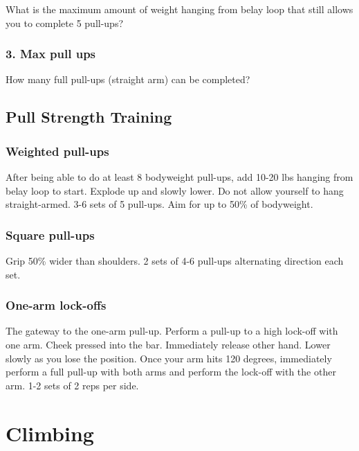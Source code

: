 \documentclass[12pt, letterpaper]{article}
\begin{document}
What is the maximum amount of weight hanging from belay loop that still
allows you to complete 5 pull-ups?

\subsubsection{3. Max pull ups}

How many full pull-ups (straight arm) can be completed? 

\subsection{Pull Strength Training}

\subsubsection{Weighted pull-ups}

After being able to do at least 8 bodyweight pull-ups, add 10-20 lbs hanging 
from belay loop to start. Explode up and slowly lower. Do not allow yourself to hang straight-armed. 
3-6 sets of 5 pull-ups. Aim for up to 50\% of bodyweight. 

\subsubsection{Square pull-ups}

Grip 50\% wider than shoulders. 2 sets of 4-6 pull-ups alternating direction each set.

\subsubsection{One-arm lock-offs}

The gateway to the one-arm pull-up. Perform a pull-up to a high lock-off with one arm. Cheek pressed into the bar. 
Immediately release other hand. Lower slowly as you lose the position. Once your arm hits 120 degrees, immediately
 perform a full pull-up with both arms and perform the lock-off with the other arm. 
  1-2 sets of 2 reps per side.

\newpage %


\section{Climbing}
\end{document}
